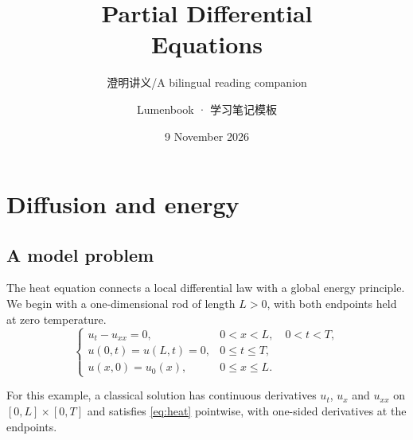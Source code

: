 \title{Partial Differential\\Equations}
\subtitle{澄明讲义\enspace /\enspace A bilingual reading companion}
\author{Lumenbook · 学习笔记模板}
\date{9 November 2026}

\frontmatter
\maketitle
\tableofcontents
\mainmatter

\chapter{Diffusion and energy}
\section{A model problem}
The heat equation connects a local differential law with a global
energy principle. We begin with a one-dimensional rod of length $L>0$,
with both endpoints held at zero temperature.
\begin{equation}\label{eq:heat}
  \begin{cases}
    u_t-u_{xx}=0, & 0<x<L,\quad 0<t<T,\\
    u(0,t)=u(L,t)=0, & 0\leq t\leq T,\\
    u(x,0)=u_0(x), & 0\leq x\leq L.
  \end{cases}
\end{equation}

\begin{definition}\label{def:classical}
For this example, a classical solution has continuous derivatives
$u_t$, $u_x$ and $u_{xx}$ on $[0,L]\times[0,T]$ and satisfies
\eqref{eq:heat} pointwise, with one-sided derivatives at the endpoints.
\end{definition}

